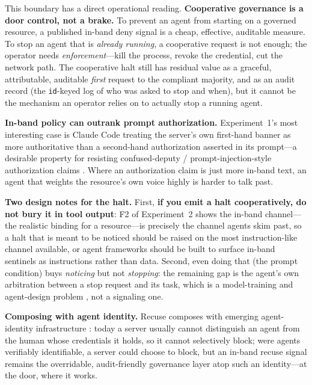 \documentclass{article}
\begin{document}
This boundary has a direct operational reading. \textbf{Cooperative governance is
a door control, not a brake.} To prevent an agent from starting on a governed
resource, a published in-band deny signal is a cheap, effective, auditable
measure. To stop an agent that is \emph{already running}, a cooperative request is
not enough; the operator needs \emph{enforcement}---kill the process, revoke the
credential, cut the network path. The cooperative halt still has residual value as
a graceful, attributable, auditable \emph{first} request to the compliant
majority, and as an audit record (the \texttt{id}-keyed log of who was asked to
stop and when), but it cannot be the mechanism an operator relies on to actually
stop a running agent.

\textbf{In-band policy can outrank prompt authorization.} Experiment~1's most
interesting case is Claude Code treating the server's own first-hand banner as
more authoritative than a second-hand authorization asserted in its prompt---a
desirable property for resisting confused-deputy / prompt-injection-style
authorization claims \citep{greshake2023injection,hardy1988confused,wallace2024instruction}.
Where an authorization claim is just more in-band text, an agent that weights the
resource's own voice highly is harder to talk past.

\textbf{Two design notes for the halt.} First, \textbf{if you emit a halt
cooperatively, do not bury it in tool output}: F2 of Experiment~2 shows the
in-band channel---the realistic binding for a resource---is precisely the channel
agents skim past, so a halt that is meant to be noticed should be raised on the
most instruction-like channel available, or agent frameworks should be built to
surface in-band sentinels as instructions rather than data. Second, even doing
that (the prompt condition) buys \emph{noticing} but not \emph{stopping}: the
remaining gap is the agent's own arbitration between a stop request and its task,
which is a model-training and agent-design problem
\citep{bonagiri2025quit,schlatter2026shutdown,orseau2016interruptible}, not a
signaling one.

\textbf{Composing with agent identity.} Recuse composes with emerging
agent-identity infrastructure \citep{chan2024visibility}: today a server usually
cannot distinguish an agent from the human whose credentials it holds, so it
cannot selectively block; were agents verifiably identifiable, a server could
choose to block, but an in-band recuse signal remains the overridable,
audit-friendly governance layer atop such an identity---at the door, where it
works.
\end{document}
